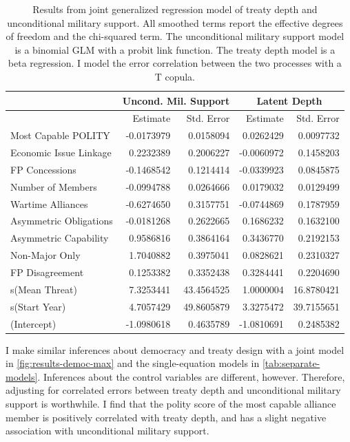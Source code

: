 \documentclass[12pt]{article}
\begin{document}
\begin{table}[ht]
\centering
\begin{tabular}{lrrrr}
  & \multicolumn{2}{c}{Uncond. Mil. Support} & \multicolumn{2}{c}{Latent Depth}\\ \hline
  & Estimate & Std. Error & Estimate & Std. Error \\ 
  \hline
  Most Capable POLITY & -0.0173979 & 0.0158094 & 0.0262429 & 0.0097732 \\ 
  Economic Issue Linkage & 0.2232389 & 0.2006227 & -0.0060972 & 0.1458203 \\ 
  FP Concessions & -0.1468542 & 0.1214414 & -0.0339923 & 0.0845875 \\ 
  Number of Members & -0.0994788 & 0.0264666 & 0.0179032 & 0.0129499 \\ 
  Wartime Alliances & -0.6274650 & 0.3157751 & -0.0744869 & 0.1787959 \\ 
  Asymmetric Obligations & -0.0181268 & 0.2622665 & 0.1686232 & 0.1632100 \\ 
  Asymmetric Capability & 0.9586816 & 0.3864164 & 0.3436770 & 0.2192153 \\ 
  Non-Major Only & 1.7040882 & 0.3975041 & 0.0828621 & 0.2310327 \\ 
  FP Disagreement & 0.1253382 & 0.3352438 & 0.3284441 & 0.2204690 \\ 
  s(Mean Threat) & 7.3253441 & 43.4564525 & 1.0000004 & 16.8780421 \\ 
  s(Start Year) & 4.7057429 & 49.8605879 & 3.3275472 & 39.7155651 \\
  (Intercept) & -1.0980618 & 0.4635789 & -1.0810691 & 0.2485382 \\  
   \hline
\end{tabular}
\caption{Results from joint generalized regression model of treaty depth and unconditional military support. 
                     All smoothed terms report the effective degrees of freedom and the chi-squared term. 
                     The unconditional military support model is a binomial GLM with a probit link function. 
                     The treaty depth model is a beta regression. 
                     I model the error correlation between the two processes with a T copula.} 
\label{tab:gjrm-res}
\end{table} 


I make similar inferences about democracy and treaty design with a joint model in \autoref{fig:results-democ-max} and the single-equation models in \autoref{tab:separate-models}.
Inferences about the control variables are different, however. 
Therefore, adjusting for correlated errors between treaty depth and unconditional military support is worthwhile. 
I find that the polity score of the most capable alliance member is positively correlated with treaty depth, and has a slight negative association with unconditional military support.
\end{document}
